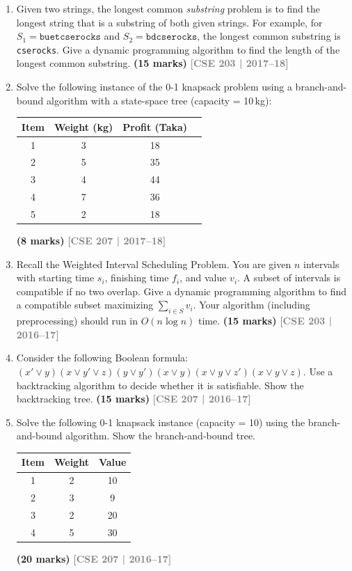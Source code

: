 \documentclass[12pt,a3paper]{article}
\newcommand{\yr}[1]{\hfill\textcolor{gray}{\small\textbf{[#1]}}}
\newcommand{\mk}[1]{\textcolor{orange!70!black}{\small\textbf{(#1 marks)}}}
\begin{document}
\begin{enumerate}
\item Given two strings, the longest common \emph{substring} problem is to find the longest string that is a substring of both given strings. For example, for $S_1 = \texttt{buetcserocks}$ and $S_2 = \texttt{bdcserocks}$, the longest common substring is \texttt{cserocks}. Give a dynamic programming algorithm to find the length of the longest common substring. \mk{15}
\yr{CSE 203 | 2017--18}

\item Solve the following instance of the 0-1 knapsack problem using a branch-and-bound algorithm with a state-space tree (capacity = 10\,kg):
\begin{center}
\begin{tabular}{cccc}
\toprule
Item & Weight (kg) & Profit (Taka) \\
\midrule
1 & 3 & 18 \\
2 & 5 & 35 \\
3 & 4 & 44 \\
4 & 7 & 36 \\
5 & 2 & 18 \\
\bottomrule
\end{tabular}
\end{center}
\mk{8}
\yr{CSE 207 | 2017--18}

\item Recall the Weighted Interval Scheduling Problem. You are given $n$ intervals with starting time $s_i$, finishing time $f_i$, and value $v_i$. A subset of intervals is compatible if no two overlap. Give a dynamic programming algorithm to find a compatible subset maximizing $\sum_{i \in S} v_i$. Your algorithm (including preprocessing) should run in $O(n \log n)$ time. \mk{15}
\yr{CSE 203 | 2016--17}

\item Consider the following Boolean formula: $(x' \vee y)(x \vee y' \vee z)(y \vee y')(x \vee y)(x \vee y \vee z')(x \vee y \vee z)$. Use a backtracking algorithm to decide whether it is satisfiable. Show the backtracking tree. \mk{15}
\yr{CSE 207 | 2016--17}

\item Solve the following 0-1 knapsack instance (capacity = 10) using the branch-and-bound algorithm. Show the branch-and-bound tree.
\begin{center}
\begin{tabular}{ccc}
\toprule
Item & Weight & Value \\
\midrule
1 & 2 & 10 \\
2 & 3 & 9 \\
3 & 2 & 20 \\
4 & 5 & 30 \\
\bottomrule
\end{tabular}
\end{center}
\mk{20}
\yr{CSE 207 | 2016--17}


\end{enumerate}
\end{document}
